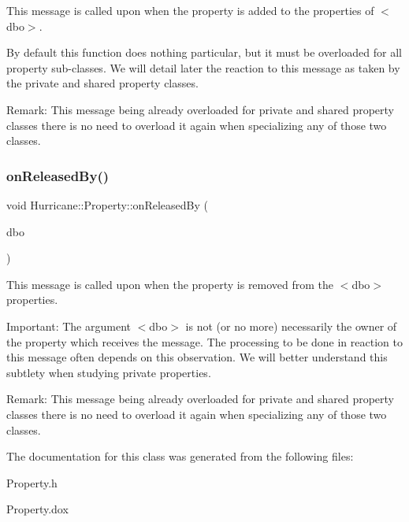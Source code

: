 This message is called upon when the property is added to the properties of {\ttfamily $<$dbo$>$}.

By default this function does nothing particular, but it must be overloaded for all property sub-\/classes. We will detail later the reaction to this message as taken by the private and shared property classes.

\begin{DoxyParagraph}{Remark\+:}
This message being already overloaded for private and shared property classes there is no need to overload it again when specializing any of those two classes. 
\end{DoxyParagraph}
\mbox{\label{classHurricane_1_1Property_a0ea7ee2089f1463c0c16e30313b54083}} 
\subsubsection{\texorpdfstring{on\+Released\+By()}{onReleasedBy()}}
{\footnotesize\ttfamily void Hurricane\+::\+Property\+::on\+Released\+By (\begin{DoxyParamCaption}\item[{\hyperlink{classHurricane_1_1DBo}{D\+Bo} $\ast$}]{dbo }\end{DoxyParamCaption})\hspace{0.3cm}{\ttfamily [pure virtual]}}

This message is called upon when the property is removed from the {\ttfamily $<$dbo$>$} properties.

\begin{DoxyParagraph}{Important\+:}
The argument {\ttfamily $<$dbo$>$} is not (or no more) necessarily the owner of the property which receives the message. The processing to be done in reaction to this message often depends on this observation. We will better understand this subtlety when studying private properties.
\end{DoxyParagraph}
\begin{DoxyParagraph}{Remark\+:}
This message being already overloaded for private and shared property classes there is no need to overload it again when specializing any of those two classes. 
\end{DoxyParagraph}


The documentation for this class was generated from the following files\+:\begin{DoxyCompactItemize}
\item 
Property.\+h\item 
Property.\+dox\end{DoxyCompactItemize}

